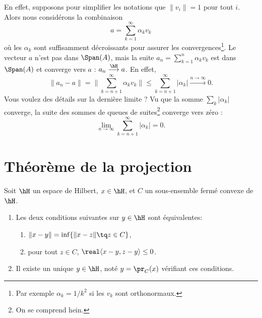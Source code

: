 En effet, supposons pour simplifier les notations que \( \| v_i \|=1\) pour tout \( i\). Alors nous considérons la combinaison
\begin{equation}
    a=\sum_{k=1}^{\infty}\alpha_kv_k
\end{equation}
où les \( \alpha_k\) sont suffisamment décroissants pour assurer les convergences\footnote{Par exemple \( \alpha_k=1/k^2\) si les \( v_k\) sont orthonormaux.}. Le vecteur \( a\) n'est pas dans \( \Span(A)\), mais la suite \( a_n=\sum_{k=1}^{n}\alpha_kv_k\) est dans \( \Span(A)\) et converge vers \( a\) : \( a_n\stackrel{\hH}{\longrightarrow}a\). En effet,
\begin{equation}
    \| a_n-a \|=\| \sum_{k=n+1}^{\infty}\alpha_kv_k \|\leq \sum_{k=n+1}^{\infty}| \alpha_k | \stackrel{n\to\infty}{\longrightarrow}0.
\end{equation}
Vous voulez des détails sur la dernière limite ? Vu que la somme \( \sum_k| \alpha_k |\) converge, la suite des sommes de queues de suites\footnote{On se comprend hein.} converge vers zéro :
\begin{equation}
    \lim_{n\to \infty} \sum_{k=n+1}^{\infty}| \alpha_k |=0.
\end{equation}

\section{Théorème de la projection}

\begin{theorem} \label{ThoProjOrthuzcYkz}
    Soit \( \hH\) un espace de Hilbert, \( x\in \hH\), et \( C\) un sous-ensemble fermé convexe de \( \hH\).
    \begin{enumerate}
        \item
            Les deux conditions suivantes sur \( y\in \hH\) sont équivalentes:
    \begin{enumerate}
        \item   \label{ETsfYCSItemi}
            \( \| x-y \|=\inf\{ \| x-z \|\tq z\in C \}\),
        \item\label{ETsfYCSItemii}
            pour tout \( z\in C\), \( \real\langle x-y, z-y\rangle \leq 0\).
    \end{enumerate}
\item
    Il existe un unique \( y\in \hH\), noté \( y=\pr_C(x)\) vérifiant ces conditions.
    \end{enumerate}
\end{theorem}

